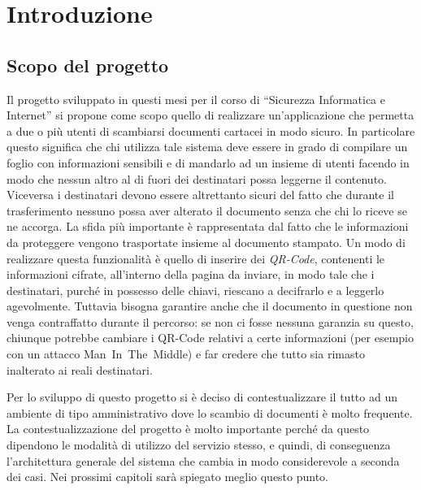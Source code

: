 \def \ti{\textit}
\def \bf{\textbf}

\chapter{Introduzione}
	\label{cap:intro}
	
\section{Scopo del progetto}
	\label{sec:scopo}

Il progetto sviluppato in questi mesi per il corso di ``Sicurezza Informatica e Internet'' si propone come scopo quello di realizzare un'applicazione che permetta a due o più utenti di scambiarsi documenti cartacei in modo sicuro. In particolare questo significa che chi utilizza tale sistema deve essere in grado di compilare un foglio con informazioni sensibili e di mandarlo ad un insieme di utenti facendo in modo che nessun altro al di fuori dei destinatari possa leggerne il contenuto. Viceversa i destinatari devono essere altrettanto sicuri del fatto che durante il trasferimento nessuno possa aver alterato il documento senza che chi lo riceve se ne accorga.
La sfida più importante è rappresentata dal fatto che le informazioni da proteggere vengono trasportate insieme al documento stampato. Un modo di realizzare questa funzionalità è quello di inserire dei \emph{QR-Code}, contenenti le informazioni cifrate, all'interno della pagina da inviare, in modo tale che i destinatari, purché in possesso delle chiavi, riescano a decifrarlo e a leggerlo agevolmente.
Tuttavia bisogna garantire anche che il documento in questione non venga contraffatto durante il percorso: se non ci fosse nessuna garanzia su questo, chiunque potrebbe cambiare i QR-Code relativi a certe informazioni (per esempio con un attacco Man~In~The~Middle) e far credere che tutto sia rimasto inalterato ai reali destinatari.

Per lo sviluppo di questo progetto si è deciso di contestualizzare il tutto ad un ambiente di tipo amministrativo dove lo scambio di documenti è molto frequente.
La contestualizzazione del progetto è molto importante perché da questo dipendono le modalità di utilizzo del servizio stesso, e quindi, di conseguenza l'architettura generale del sistema che cambia in modo considerevole a seconda dei casi. Nei prossimi capitoli sarà spiegato meglio questo punto.  


